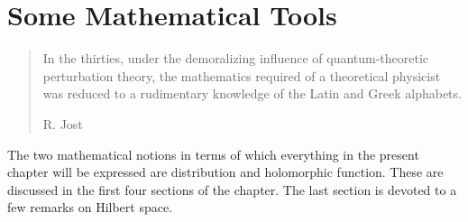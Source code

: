 \section{Some Mathematical Tools}\label{sec:ch2}

\begin{quote}
In the thirties, under the demoralizing influence of quantum-theoretic
perturbation theory, the mathematics required of a theoretical physicist was
reduced to a rudimentary knowledge of the Latin and Greek alphabets.
\begin{flushright}
R. Jost
\end{flushright}
\end{quote}

The two mathematical notions in terms of which everything in the present
chapter will be expressed are distribution and holomorphic function. These are
discussed in the first four sections of the chapter. The last section is
devoted to a few remarks on Hilbert space.
